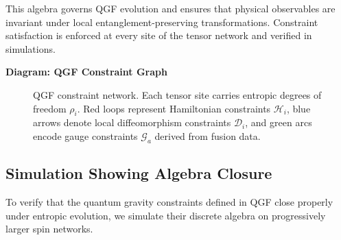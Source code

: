 \documentclass[11pt]{article}
\begin{document}
This algebra governs QGF evolution and ensures that physical observables are invariant under local entanglement-preserving transformations. Constraint satisfaction is enforced at every site of the tensor network and verified in simulations.

\vspace{0.8em}
\noindent\textbf{Diagram: QGF Constraint Graph}

\begin{figure}[H]
\centering
{}
\caption{QGF constraint network. Each tensor site carries entropic degrees of freedom \( \rho_i \). Red loops represent Hamiltonian constraints \( \mathcal{H}_i \), blue arrows denote local diffeomorphism constraints \( \mathcal{D}_i \), and green arcs encode gauge constraints \( \mathcal{G}_a \) derived from fusion data.}
\label{fig:qgf-constraints}
\end{figure}



\subsection*{Simulation Showing Algebra Closure}

To verify that the quantum gravity constraints defined in QGF close properly under entropic evolution, we simulate their discrete algebra on progressively larger spin networks.
\end{document}

